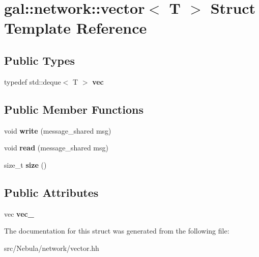 \hypertarget{structgal_1_1network_1_1vector}{\section{gal\-:\-:network\-:\-:vector$<$ T $>$ Struct Template Reference}
\label{structgal_1_1network_1_1vector}
}
\subsection*{Public Types}
\begin{DoxyCompactItemize}
\item 
\hypertarget{structgal_1_1network_1_1vector_af890cdbf59fd597b4034c4edf9a1826c}{typedef std\-::deque$<$ T $>$ {\bfseries vec}}\label{structgal_1_1network_1_1vector_af890cdbf59fd597b4034c4edf9a1826c}

\end{DoxyCompactItemize}
\subsection*{Public Member Functions}
\begin{DoxyCompactItemize}
\item 
\hypertarget{structgal_1_1network_1_1vector_aad0e2d9ae7b9eb9af0173690fca44db6}{void {\bfseries write} (message\-\_\-shared msg)}\label{structgal_1_1network_1_1vector_aad0e2d9ae7b9eb9af0173690fca44db6}

\item 
\hypertarget{structgal_1_1network_1_1vector_a9049ddcdf1c2f6e5722899f8363162fc}{void {\bfseries read} (message\-\_\-shared msg)}\label{structgal_1_1network_1_1vector_a9049ddcdf1c2f6e5722899f8363162fc}

\item 
\hypertarget{structgal_1_1network_1_1vector_adbffe90ff20f537ee98b611e0a5f474c}{size\-\_\-t {\bfseries size} ()}\label{structgal_1_1network_1_1vector_adbffe90ff20f537ee98b611e0a5f474c}

\end{DoxyCompactItemize}
\subsection*{Public Attributes}
\begin{DoxyCompactItemize}
\item 
\hypertarget{structgal_1_1network_1_1vector_a4efde91878f4a0e451955b18dcc6a7bd}{vec {\bfseries vec\-\_\-}}\label{structgal_1_1network_1_1vector_a4efde91878f4a0e451955b18dcc6a7bd}

\end{DoxyCompactItemize}


The documentation for this struct was generated from the following file\-:\begin{DoxyCompactItemize}
\item 
src/\-Nebula/network/vector.\-hh\end{DoxyCompactItemize}
